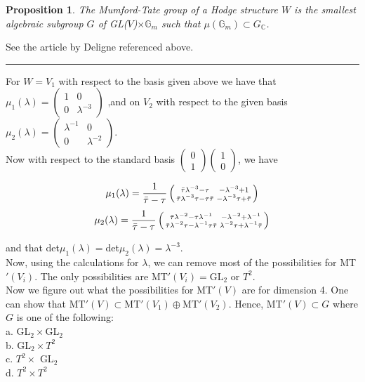 \documentclass[12pt,titlepage]{article}
\newenvironment{proof}{\medskip {\it Proof.\ }}{\ \rule[-0.5mm]{1mm}
          {3.5mm}\medskip\noindent}
\newtheorem{prop}[lem]{Proposition}
\begin{document}
\begin{prop}
   The Mumford-Tate group of a Hodge structure $W$ is the smallest algebraic subgroup $G$  of GL($V$)$\times \mathbb{G}_{m}$
   such that $\mu (\mathbb{G}_{m}) \subset G_{\mathbb{C}}$.
\end{prop}

\noindent
\begin{proof}
  See the article by Deligne referenced above.
\end{proof}

For $W=V_1$ with respect to the basis given above we have that $\mu_1(\lambda) =
\left( \begin{smallmatrix} 1&0\\ 0&\lambda^{-3} \end{smallmatrix} \right)$
,and on $V_2$ with respect to the given basis $\mu_2(\lambda)=
\left( \begin{smallmatrix} \lambda^{-1}&0 \\ 0&\lambda^{-2} \end{smallmatrix} \right).$\\
Now with respect to the standard basis $\left( \begin{smallmatrix} 0\\1 \end{smallmatrix} \right)
\left( \begin{smallmatrix} 1\\0 \end{smallmatrix} \right)$, we have

\[\mu_1(\lambda) = \frac{1}{\Bar{\tau} - \tau} \left(
     \begin{smallmatrix} \Bar{\tau}\lambda^{-3} - \tau & -\lambda^{-3} + 1 \\
                         \Bar{\tau}\lambda^{-3}\tau - \tau\Bar{\tau} & -\lambda^{-3}\tau + \Bar{\tau}
     \end{smallmatrix} \right) \]
\[\mu_2(\lambda) =  \frac{1}{\Bar{\tau} - \tau} \left(
     \begin{smallmatrix} \Bar{\tau}\lambda^{-2} - \tau\lambda^{-1} & -\lambda^{-2} + \lambda^{-1}\\
                         \Bar{\tau}\lambda^{-2}\tau - \lambda^{-1}\tau\Bar{\tau} & \lambda^{-2}\tau + \lambda^{-1}\Bar{\tau}
     \end{smallmatrix} \right) \]

\noindent
and that det$\mu_1(\lambda)=$det$\mu_2(\lambda) = \lambda^{-3}$.\\

Now, using the calculations for $\lambda$, we can remove most of the possibilities for MT$'(V_{i})$.
The only possibilities are $\text{MT}'(V_{i}) = \text{GL}_2$ or $T^2$.\\
Now we figure out what the possibilities for MT$'(V)$ are for
dimension 4.  One can show that $\text{MT}'(V) \subset
\text{MT}'(V_1) \oplus \text{MT}'(V_2)$.  Hence, MT$'(V) \subset
G$ where $G$ is one of the following:\\
  \indent a. GL$_2 \times$GL$_2$\\
  \indent b. GL$_2 \times T^2$\\
  \indent c. $T^2 \times$ GL$_2$\\
  \indent d. $T^2 \times T^2$
\end{document}

